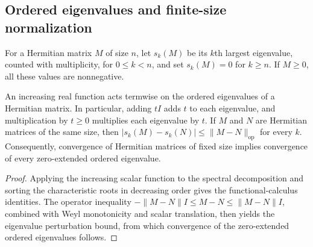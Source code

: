 \subsection{Ordered eigenvalues and finite-size normalization}

\begin{definition}%
    \label{def:half_chain_ordered_spectrum}
    \leanok
    For a Hermitian matrix $M$ of size $n$, let $s_k(M)$ be its $k$th
    largest eigenvalue, counted with multiplicity, for $0\leq k<n$, and
    set $s_k(M)=0$ for $k\geq n$. If $M\geq0$, all these values are
    nonnegative.
\end{definition}

\begin{lemma}%
    \label{thm:half_chain_weyl}
    \leanok
    An increasing real function acts termwise on the ordered eigenvalues
    of a Hermitian matrix. In particular, adding $tI$ adds $t$ to each
    eigenvalue, and multiplication by $t\geq0$ multiplies each eigenvalue
    by $t$. If $M$ and $N$ are Hermitian matrices of the same size, then
    $|s_k(M)-s_k(N)|\leq\lVert M-N\rVert_{\mathrm{op}}$ for every $k$.
    Consequently, convergence of Hermitian matrices of fixed size implies
    convergence of every zero-extended ordered eigenvalue.
\end{lemma}

\begin{proof}
    \leanok
    Applying the increasing scalar function to the spectral decomposition and
    sorting the characteristic roots in decreasing order gives the
    functional-calculus identities. The operator inequality
    $-\lVert M-N\rVert I\leq M-N\leq\lVert M-N\rVert I$, combined with Weyl
    monotonicity and scalar translation, then yields the eigenvalue
    perturbation bound, from which convergence of the zero-extended ordered
    eigenvalues follows.
\end{proof}

